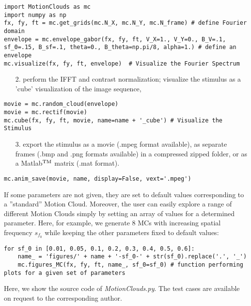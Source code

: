 \documentclass[a4paper,11pt]{article}%
\begin{document}
\begin{lstlisting}
import MotionClouds as mc
import numpy as np
fx, fy, ft = mc.get_grids(mc.N_X, mc.N_Y, mc.N_frame) # define Fourier domain
envelope = mc.envelope_gabor(fx, fy, ft, V_X=1., V_Y=0., B_V=.1, sf_0=.15, B_sf=.1, theta=0., B_theta=np.pi/8, alpha=1.) # define an envelope
mc.visualize(fx, fy, ft, envelope)  # Visualize the Fourier Spectrum
\end{lstlisting}

\begin{enumerate}	
\item[2.] perform the IFFT and contrast normalization; visualize the stimulus as a 'cube' visualization of the image sequence,
\end{enumerate}

\begin{lstlisting}
movie = mc.random_cloud(envelope)
movie = mc.rectif(movie)
mc.cube(fx, fy, ft, movie, name=name + '_cube') # Visualize the Stimulus
\end{lstlisting} 

\begin{enumerate}
\item[3.] export the stimulus as a movie (.mpeg format available), as separate frames (.bmp and .png formats available) in a compressed zipped folder, or as a Matlab$^{\rm TM}$ matrix (.mat format). 
\end{enumerate}

\begin{lstlisting}
mc.anim_save(movie, name, display=False, vext='.mpeg')
\end{lstlisting}

If some parameters are not given, they are set to default values corresponding to a ''standard'' Motion Cloud. Moreover, the user can easily explore a range of different Motion Clouds simply by setting  an array of values for a determined parameter. Here, for example, we generate 8 MCs with increasing spatial frequency $s_{f_0}$ while keeping the other parameters fixed to default values:
%
\begin{lstlisting}
for sf_0 in [0.01, 0.05, 0.1, 0.2, 0.3, 0.4, 0.5, 0.6]:
	name_ = 'figures/' + name + '-sf_0-' + str(sf_0).replace('.', '_')
	mc.figures_MC(fx, fy, ft, name_, sf_0=sf_0) # function performing plots for a given set of parameters
\end{lstlisting}

Here, we show the source code of \textit{MotionClouds.py}. The test cases are available on request to the corresponding author. 
\end{document}
